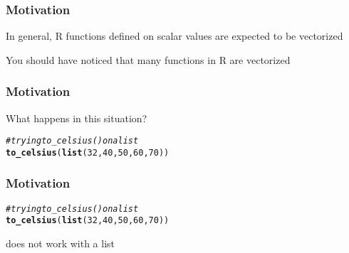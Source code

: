 \documentclass[12pt]{beamer}\usepackage[]{graphicx}\usepackage[]{color}
\makeatletter
\newcommand{\hlnum}[1]{\textcolor[rgb]{0.686,0.059,0.569}{#1}}%
\newcommand{\hlcom}[1]{\textcolor[rgb]{0.678,0.584,0.686}{\textit{#1}}}%
\newcommand{\hlstd}[1]{\textcolor[rgb]{0.345,0.345,0.345}{#1}}%
\newcommand{\hlkwd}[1]{\textcolor[rgb]{0.737,0.353,0.396}{\textbf{#1}}}%
\newenvironment{kframe}{%
 \def\at@end@of@kframe{}%
 \ifinner\ifhmode%
  \def\at@end@of@kframe{\end{minipage}}%
  \begin{minipage}{\columnwidth}%
 \fi\fi%
 \def\FrameCommand##1{\hskip\@totalleftmargin \hskip-\fboxsep
 \colorbox{shadecolor}{##1}\hskip-\fboxsep
     \hskip-\linewidth \hskip-\@totalleftmargin \hskip\columnwidth}%
 \MakeFramed {\advance\hsize-\width
   \@totalleftmargin\z@ \linewidth\hsize
   \@setminipage}}%
 {\par\unskip\endMakeFramed%
 \at@end@of@kframe}
\newenvironment{knitrout}{}{} %
\makeatother
\begin{document}

\begin{frame}[fragile]
\frametitle{Motivation}

\bi
  \item In general, R functions defined on scalar values are expected to be vectorized
  \item You should have noticed that many functions in R are vectorized
\ei

\end{frame}


\begin{frame}[fragile]
\frametitle{Motivation}

What happens in this situation?
\begin{knitrout}\footnotesize
{}\color{fgcolor}\begin{kframe}
\begin{alltt}
\hlcom{# trying to_celsius() on a list}
\hlkwd{to_celsius}\hlstd{(}\hlkwd{list}\hlstd{(}\hlnum{32}\hlstd{,} \hlnum{40}\hlstd{,} \hlnum{50}\hlstd{,} \hlnum{60}\hlstd{,} \hlnum{70}\hlstd{))}
\end{alltt}
\end{kframe}
\end{knitrout}

\end{frame}


\begin{frame}[fragile]
\frametitle{Motivation}

\begin{knitrout}\footnotesize
{}\color{fgcolor}\begin{kframe}
\begin{alltt}
\hlcom{# trying to_celsius() on a list}
\hlkwd{to_celsius}\hlstd{(}\hlkwd{list}\hlstd{(}\hlnum{32}\hlstd{,} \hlnum{40}\hlstd{,} \hlnum{50}\hlstd{,} \hlnum{60}\hlstd{,} \hlnum{70}\hlstd{))}
\end{alltt}


{\ttfamily\noindent\bfseries\color{errorcolor}{\#\# Error in x - 32: non-numeric argument to binary operator}}\end{kframe}
\end{knitrout}

 does not work with a list

\end{frame}
\end{document}
